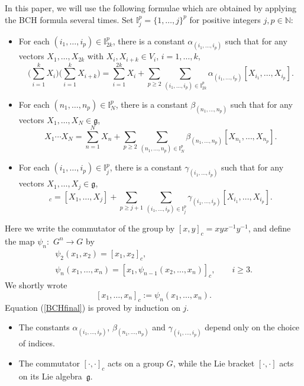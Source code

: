 \documentclass[10pt,a4paper]{amsart}
\numberwithin{equation}{section}
\newcommand{\g}{\mathfrak{g}}
\newcommand{\N}{\mathbb{N}}
\begin{document}
In this paper,
we will use the following formulae which are obtained by applying the BCH formula several times.
Set $\mathbb{I}_j^p=\{1,\dots,j\}^p$ for positive integers $j,p\in\N$:
\begin{itemize}\itemsep=0pt
 \item For each $(i_1,\dots,i_p)\!\in\!\mathbb{I}_{2k}^p$,
 there is a constant $\alpha_{(i_1,\dots,i_p)}$ such that for any vectors $X_1,\dots,X_{2k}$ with $X_i,X_{i+k}\in V_i$, $i=1,\dots,k$,
 \begin{equation}
 \Bigg(\sum_{i=1}^kX_i\Bigg)\Bigg(\sum_{i=1}^k X_{i+k}\Bigg)=\sum_{i=1}^{2k}X_i+\sum_{p\geq 2}\sum_{(i_1,\dots,i_p)\in \mathbb{I}_{2k}^p}\alpha_{(i_1,\dots,i_p)}[X_{i_1},\dots,X_{i_p}].\label{BCH1}
 \end{equation}
 \item For each $(n_1,\dots,n_p)\in\mathbb{I}_N^p$,
 there is a constant $\beta_{(n_1,\dots,n_p)}$ such that for any vectors $X_1,\dots,\allowbreak X_N\in\g$,
\begin{equation}
 X_1\cdots X_N
 =\sum_{n=1}^NX_n+\sum_{p\geq 2}\sum_{(n_1,\dots,n_p)\in\mathbb{I}_N^p}\beta_{(n_1,\dots,n_p)}[X_{n_1},\dots,X_{n_p}].\label{BCH2}
\end{equation}
\item For each $(i_1,\dots,i_p)\in\mathbb{I}_j^{p}$,
there is a constant $\gamma_{(i_1,\dots,i_p)}$ such that for any vectors $X_1,\dots,\allowbreak X_j\in\g$,
\begin{equation}
[X_1,\dots,X_j]_c
=[X_1,\dots,X_j]+\sum_{p\geq j+1}\sum_{(i_1,\dots,i_p)\in\mathbb{I}_j^p}\gamma_{(i_1,\dots,i_p)}[X_{i_1},\dots,X_{i_p}].\label{BCHfinal}
\end{equation}
\end{itemize}
Here we write the commutator of the group by $[x,y]_c=xyx^{-1}y^{-1}$,
and define the map $\psi_n{:}$ $G^n\to G$ by
\begin{gather*}
\psi_2(x_1,x_2)=[x_1,x_2]_c,
\\
\psi_n(x_1,\dots,x_n)=[x_1,\psi_{n-1}(x_2,\dots,x_n)]_c, \qquad i\geq 3.
\end{gather*}
We shortly wrote
\[
[x_1,\dots,x_n]_c:=\psi_n(x_1,\dots,x_n).
\]
Equation (\ref{BCHfinal}) is proved by induction on $j$.

\begin{Remark}\qquad
\begin{itemize}\itemsep=0pt
 \item The constants $\alpha_{(i_1,\dots,i_p)}$,
$\beta_{(n_1,\dots,n_p)}$ and $\gamma_{(i_1,\dots,i_p)}$ depend only on the choice of indices.
\item The commutator $[\cdot,\cdot]_c$ acts on a group $G$,
while the Lie bracket $[\cdot,\cdot]$ acts on its Lie algebra~$\g$.
\end{itemize}
\end{Remark}
\end{document}
